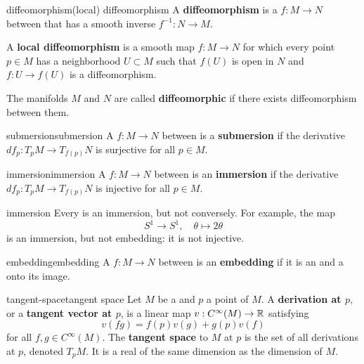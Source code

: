 \begin{topic}{diffeomorphism}{(local) diffeomorphism}
    A \textbf{diffeomorphism} is a  $f : M \to N$ between  that has a smooth inverse $f^{-1} : N \to M$.
    
    A \textbf{local diffeomorphism} is a smooth map $f : M \to N$ for which every point $p \in M$ has a neighborhood $U \subset M$ such that $f(U)$ is open in $N$ and $f : U \to f(U)$ is a diffeomorphism.
    
    The manifolds $M$ and $N$ are called \textbf{diffeomorphic} if there exists diffeomorphism between them.
\end{topic}

\begin{topic}{submersion}{submersion}
    A  $f : M \to N$ between  is a \textbf{submersion} if the derivative $df_p : T_p M \to T_{f(p)} N$ is surjective for all $p \in M$.
\end{topic}

\begin{topic}{immersion}{immersion}
    A  $f : M \to N$ between  is an \textbf{immersion} if the derivative $df_p : T_p M \to T_{f(p)} N$ is injective for all $p \in M$.
\end{topic}

\begin{example}{immersion}
    Every  is an immersion, but not conversely. For example, the map
    \[ S^1 \to S^1, \quad \theta \mapsto 2 \theta  \]
    is an immersion, but not embedding: it is not injective.
\end{example}

\begin{topic}{embedding}{embedding}
    A  $f : M \to N$ between  is an \textbf{embedding} if it is an  and a  onto its image.
\end{topic}

\begin{topic}{tangent-space}{tangent space}
    Let $M$ be a  and $p$ a point of $M$. A \textbf{derivation at $p$}, or a \textbf{tangent vector at $p$}, is a linear map $v : C^\infty(M) \to \mathbb{R}$ satisfying
    \[ v(fg) = f(p) v(g) + g(p) v(f) \]
    for all $f, g \in C^\infty(M)$. The \textbf{tangent space} to $M$ at $p$ is the set of all derivations at $p$, denoted $T_p M$. It is a real  of the same dimension as the dimension of $M$.
\end{topic}

